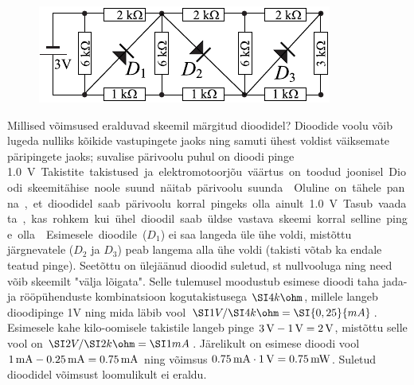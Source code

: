 
\begin{figure}
\includegraphics[width=\linewidth]{2012-lahg-08-dioodid}
\end{figure}
Millised võimsused eralduvad skeemil märgitud dioodidel? Dioodide voolu võib lugeda
nulliks kõikide vastupingete jaoks ning samuti ühest voldist
väiksemate päripingete jaoks; suvalise pärivoolu puhul on dioodi pinge
\SI{1,0}V. Takistite takistused ja elektromotoorjõu väärtus on toodud
joonisel. Dioodi skeemitähise noole suund näitab pärivoolu
suunda.

\hint
Oluline on tähele panna, et dioodidel saab pärivoolu korral pingeks olla ainult \SI{1,0}{V}. Tasub vaadata, kas rohkem kui ühel dioodil saab üldse vastava skeemi korral selline pinge olla.

\solu
Esimesele dioodile ($D_1$) ei saa langeda üle ühe voldi, mistõttu järgnevatele ($D_2$ ja $D_3$) peab langema alla ühe voldi (takisti võtab ka endale teatud pinge).
Seetõttu on ülejäänud dioodid suletud, st nullvooluga ning need võib skeemilt "välja lõigata". Selle tulemusel moodustub esimese dioodi taha 
jada- ja rööpühenduste kombinatsioon kogutakistusega $\SI 4{k\ohm}$, millele langeb dioodipinge 1V ning mida läbib vool $\SI 1V /\SI 4{k\ohm}= \SI {0,25}{mA}$. 
Esimesele kahe kilo-oomisele takistile langeb pinge $\SI 3V-\SI 1V=\SI 2V$, mistõttu selle vool on $\SI 2V/\SI 2{k\ohm}=\SI 1{mA}$. Järelikult on esimese dioodi vool
$\SI 1{mA}-\SI {0,25}{mA}=\SI{0,75}{mA}$ ning võimsus $\SI{0,75}{mA}\cdot \SI 1V=\SI{0,75}{mW}$. Suletud dioodidel võimsust loomulikult ei eraldu.

